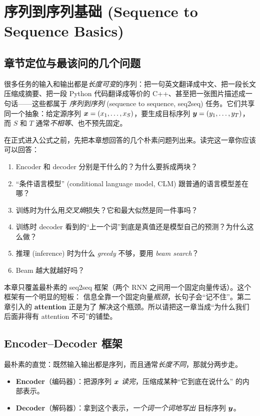 \section{序列到序列基础 (Sequence to Sequence Basics)}
\label{ch:seq2seq-basics}

\subsection{章节定位与最该问的几个问题}

很多任务的输入和输出都是\emph{长度可变}的序列：把一句英文翻译成中文、把一段长文压缩成摘要、把一段
Python 代码翻译成等价的 C++、甚至把一张图片描述成一句话——这些都属于
\emph{序列到序列} (sequence to sequence, seq2seq) 任务。它们共享同一个抽象：给定源序列
$\boldsymbol{x} = (x_1, \dots, x_S)$，要生成目标序列 $\boldsymbol{y} = (y_1, \dots, y_T)$，而 $S$ 和 $T$
通常\emph{不相等}、也不预先固定。

\begin{problemblock}
在正式进入公式之前，先把本章想回答的几个朴素问题列出来。读完这一章你应该可以回答：
\begin{enumerate}
    \item Encoder 和 decoder 分别是干什么的？为什么要拆成两块？
    \item “条件语言模型” (conditional language model, CLM) 跟普通的语言模型差在哪？
    \item 训练时为什么用\emph{交叉熵}损失？它和最大似然是同一件事吗？
    \item 训练时 decoder 看到的“上一个词”到底是真值还是模型自己的预测？为什么这么做？
    \item 推理 (inference) 时为什么 \emph{greedy} 不够，要用 \emph{beam search}？
    \item Beam 越大就越好吗？
\end{enumerate}
\end{problemblock}

本章只覆盖最朴素的 seq2seq 框架（两个 RNN 之间用一个固定向量传话）。这个框架有一个明显的短板：
信息全靠一个固定向量\emph{瓶颈}，长句子会“记不住”。第二章引入的 \textbf{attention} 正是为了
解决这个瓶颈。所以请把这一章当成“为什么我们后面非得有 attention 不可”的铺垫。

\subsection{Encoder–Decoder 框架}
\label{sec:encdec}

\begin{intuitionblock}
最朴素的直觉：既然输入输出都是序列，而且通常\emph{长度不同}，那就分两步走。
\begin{itemize}
    \item \textbf{Encoder}（编码器）：把源序列 $\boldsymbol{x}$ \emph{读完}，压缩成某种“它到底在说什么”
          的内部表示。
    \item \textbf{Decoder}（解码器）：拿到这个表示，\emph{一个词一个词地写出} 目标序列 $\boldsymbol{y}$。
\end{itemize}
\end{intuitionblock}

